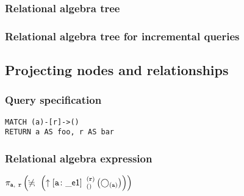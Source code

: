 \subsubsection*{Relational algebra tree}


\subsubsection*{Relational algebra tree for incremental queries}


\subsection{Projecting nodes and relationships}

\subsubsection*{Query specification}

\begin{lstlisting}
MATCH (a)-[r]->()
RETURN a AS foo, r AS bar
\end{lstlisting}

\subsubsection*{Relational algebra expression}

$\projection{\var{a},~\var{r}} \left(\alldifferent{} \left(\expandout{a}{\_e1}{}{r}{} \left(\getvertices{a}{}\right)\right)\right)$

